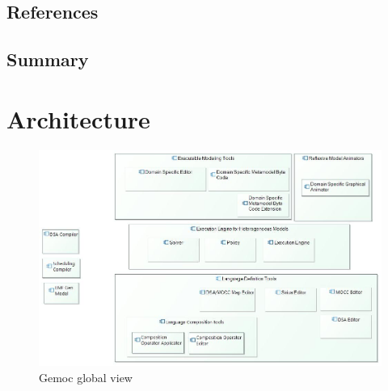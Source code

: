 \documentclass{gemoc} %
\begin{document}
\section{References}


\section{Summary}

 
\chapter{Architecture}
\begin{figure}[bt]
	\begin{center}
	\includegraphics*[trim=0.0cm 0.0cm 0cm 0.0cm, clip=true, width=1.0\linewidth]{../images/Global View.jpg}
	\caption{Gemoc global view}
	\label{fig:ComponentList}
	\end{center}
\end{figure}
\end{document}

